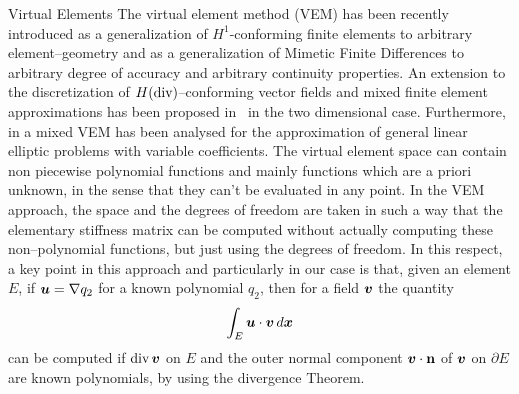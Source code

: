 \begin{chapter}{Virtual Elements}
The virtual element method (VEM) has been recently introduced \cite{MR2997471} 
as a generalization of $H^1$-conforming finite elements to arbitrary 
element--geometry 
and as a generalization of Mimetic Finite Differences to arbitrary degree 
of
accuracy and arbitrary continuity properties. An extension to 
the discretization of $H(\operatorname{\textrm{div}})$--conforming vector fields and mixed finite 
element 
approximations has been proposed in~\cite{bfm} 
in the two dimensional case. Furthermore, in \cite{MR3507271} a mixed VEM 
has been
analysed for the approximation of general linear elliptic problems with variable
coefficients.  
The virtual element space can contain non piecewise polynomial
functions and mainly functions which are a priori unknown, 
in the sense that they
can't be evaluated in any point. In the VEM approach, the space and the degrees
of freedom are taken in such a way that the elementary stiffness matrix can be 
computed without actually computing these non--polynomial functions, but just using 
the degrees of freedom. In this respect, a key
point in this approach and particularly in our case is that, 
given an element $E$, if $\boldsymbol{u}=\nabla q_2$ for a known 
polynomial $q_2$, then for a field $\boldsymbol{v}$ the quantity 
\[
\int_E\boldsymbol{u}\cdot\boldsymbol{v}\,d\boldsymbol{x}
\]
can be computed if $\mbox{div\,}\boldsymbol{v}$ on $E$ and the outer normal 
component $\boldsymbol{v}\cdot{\bf n}$ of $\boldsymbol{v}$ on 
$\partial E$ are known polynomials, by using the divergence Theorem.

\end{chapter}

